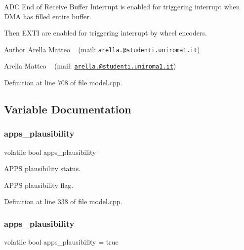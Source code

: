 A\+DC End of Receive Buffer Interrupt is enabled for triggering interrupt when D\+MA has filled entire buffer.

Then E\+X\+TI are enabled for triggering interrupt by wheel encoders.

\begin{DoxyAuthor}{Author}
Arella Matteo ~\newline
 (mail\+: \href{mailto:arella.1646983@studenti.uniroma1.it}{\tt arella.@studenti.\+uniroma1.\+it})

Arella Matteo ~\newline
 (mail\+: \href{mailto:arella.1646983@studenti.uniroma1.it}{\tt arella.@studenti.\+uniroma1.\+it}) 
\end{DoxyAuthor}


Definition at line 708 of file model.\+cpp.



\subsection{Variable Documentation}
\mbox{\label{group___board__model__group_gaa9de48f5a49bc92a608ed315c087f3a6}} 
\subsubsection{\texorpdfstring{apps\+\_\+plausibility}{apps\_plausibility}\hspace{0.1cm}{\footnotesize\ttfamily [1/2]}}
{\footnotesize\ttfamily volatile bool apps\+\_\+plausibility}



A\+P\+PS plausibility status. 

A\+P\+PS plausibility flag. 

Definition at line 338 of file model.\+cpp.

\mbox{\label{group___board__model__group_gaa9de48f5a49bc92a608ed315c087f3a6}} 
\subsubsection{\texorpdfstring{apps\+\_\+plausibility}{apps\_plausibility}\hspace{0.1cm}{\footnotesize\ttfamily [2/2]}}
{\footnotesize\ttfamily volatile bool apps\+\_\+plausibility = true}



